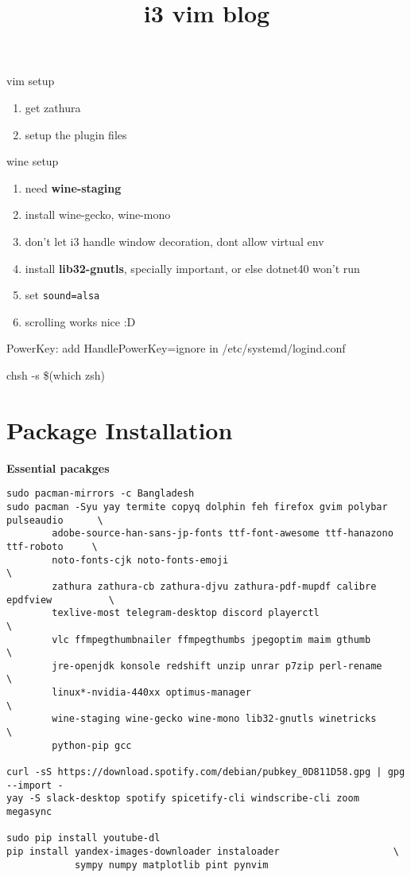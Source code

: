 \documentclass[11pt, article, a4paper]{memoir}
\title{i3 vim blog}
\begin{document}
\maketitle
    

vim setup

\begin{enumerate}
    \item get zathura
    \item setup the plugin files
\end{enumerate}

wine setup

\begin{enumerate}
    \item need \textbf{wine-staging}
    \item install wine-gecko, wine-mono
    \item don't let i3 handle window decoration, dont allow virtual env
    \item install \textbf{lib32-gnutls}, specially important, or else dotnet40 won't run
    \item set \texttt{sound=alsa}
    \item scrolling works nice :D
\end{enumerate}

PowerKey: add HandlePowerKey=ignore in /etc/systemd/logind.conf

chsh -s \$(which zsh) %

\newpage
\section*{Package Installation}

\textbf{Essential pacakges}

\begin{lstlisting}[style=mybash]
sudo pacman-mirrors -c Bangladesh
sudo pacman -Syu yay termite copyq dolphin feh firefox gvim polybar pulseaudio      \
        adobe-source-han-sans-jp-fonts ttf-font-awesome ttf-hanazono ttf-roboto     \
        noto-fonts-cjk noto-fonts-emoji                                             \
        zathura zathura-cb zathura-djvu zathura-pdf-mupdf calibre epdfview          \
        texlive-most telegram-desktop discord playerctl                             \
        vlc ffmpegthumbnailer ffmpegthumbs jpegoptim maim gthumb                    \
        jre-openjdk konsole redshift unzip unrar p7zip perl-rename                  \
        linux*-nvidia-440xx optimus-manager                                         \
        wine-staging wine-gecko wine-mono lib32-gnutls winetricks                   \
        python-pip gcc

curl -sS https://download.spotify.com/debian/pubkey_0D811D58.gpg | gpg --import -
yay -S slack-desktop spotify spicetify-cli windscribe-cli zoom megasync

sudo pip install youtube-dl 
pip install yandex-images-downloader instaloader                    \
            sympy numpy matplotlib pint pynvim
\end{lstlisting}
\end{document}

